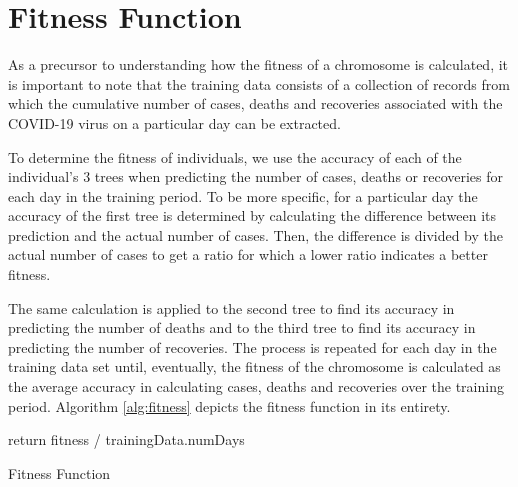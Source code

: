 \section{Fitness Function}\label{sec:fitness}
As a precursor to understanding how the fitness of a chromosome is calculated, it is important to note that the training data consists of a collection of records from which the cumulative number of cases, deaths and recoveries associated with the COVID-19 virus on a particular day can be extracted.

To determine the fitness of individuals, we use the accuracy of each of the individual's 3 trees when predicting the number of cases, deaths or recoveries for each day in the training period. To be more specific, for a particular day the accuracy of the first tree is determined by calculating the difference between its prediction and the actual number of cases. Then, the difference is divided by the actual number of cases to get a ratio for which a lower ratio indicates a better fitness.

The same calculation is applied to the second tree to find its accuracy in predicting the number of deaths and to the third tree to find its accuracy in predicting the number of recoveries. The process is repeated for each day in the training data set until, eventually, the fitness of the chromosome is calculated as the average accuracy in calculating cases, deaths and recoveries over the training period. Algorithm \ref{alg:fitness} depicts the fitness function in its entirety.

\begin{algorithm}[H]\label{alg:fitness}
\SetAlgoLined
 \BlankLine
 return fitness / trainingData.numDays\;
 \caption{Fitness Function}
\end{algorithm}
